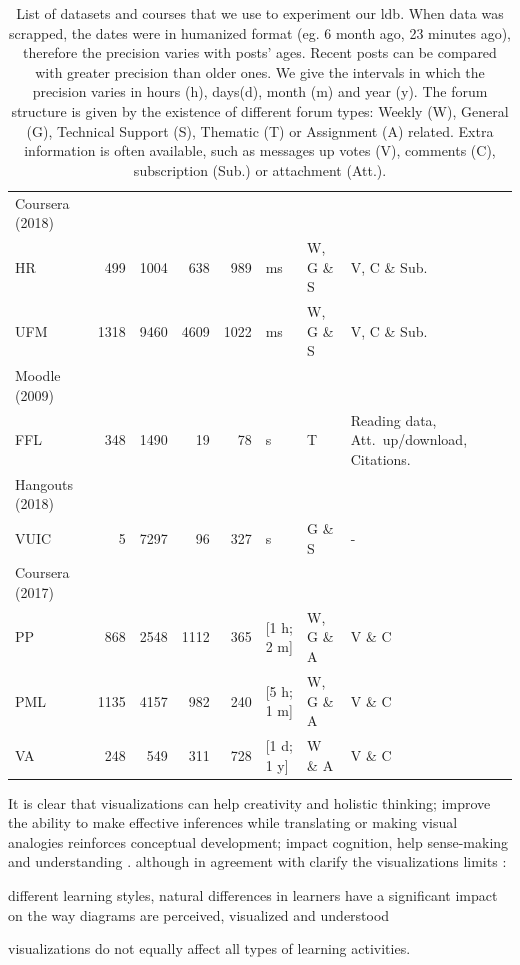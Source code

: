 \documentclass[a4paper,twoside]{article}
\begin{document}
\begin{table}[t]
\begin{tabular}{lllrrllp{}}
    Coursera (2018) &  &  & \multicolumn{1}{l}{} & \multicolumn{1}{l}{} &  &  &  \\ [.2cm]
    HR & \multicolumn{1}{r}{499} & \multicolumn{1}{r}{1004} & 638 & 989 & ms & W, G \& S & V, C \& Sub. \\
    UFM & \multicolumn{1}{r}{1318} & \multicolumn{1}{r}{9460} & 4609 & 1022 & ms & W, G \& S & V, C \& Sub. \\ \hline
    Moodle (2009) &  &  & \multicolumn{1}{l}{} & \multicolumn{1}{l}{} &  &  &  \\ [.2cm]
    FFL & \multicolumn{1}{r}{348} & \multicolumn{1}{r}{1490} & 19 & 78 & s & T & Reading data, Att.~up/download, Citations. \\ \hline
    Hangouts (2018) &  &  & \multicolumn{1}{l}{} & \multicolumn{1}{l}{} &  &  &  \\ [.2cm]
    VUIC & \multicolumn{1}{r}{5} & 7297 & 96 & 327 & s & G \& S & - \\ \hline
    Coursera (2017) &  &  & \multicolumn{1}{l}{} & \multicolumn{1}{l}{} &  &  &  \\ [.2cm]
    PP & \multicolumn{1}{r}{868} & \multicolumn{1}{r}{2548} & 1112 & 365 & [1 h; 2 m] &W, G \& A & V \& C \\
    PML & \multicolumn{1}{r}{1135} & \multicolumn{1}{r}{4157} & 982 & 240 & [5 h; 1 m] & W, G \& A & V \& C \\
    VA & \multicolumn{1}{r}{248} & \multicolumn{1}{r}{549} & 311 & 728 & [1 d; 1 y] & W \& A & V \& C \\
    \bottomrule
  \end{tabular}
  \caption{\label{tab:datasets}List of datasets and courses that we use to experiment our \gls{ldb}.  When data was scrapped, the dates were in humanized format (eg. 6 month ago, 23 minutes ago), therefore the precision varies with posts' ages.  Recent posts can be compared with greater precision than older ones. We give the intervals in which the precision varies in hours (h), days(d), month (m) and year (y).  The forum structure is given by the existence of different forum types: Weekly (W), General (G), Technical Support (S), Thematic (T) or Assignment (A) related.  Extra information is often available, such as messages up votes (V), comments (C), subscription (Sub.) or attachment (Att.). }
\end{table}

It is clear that visualizations can help creativity and holistic thinking; improve the ability to make effective inferences while translating or making visual analogies reinforces conceptual development; impact cognition, help sense-making and understanding \citep{Klerkx2014}.  \cite{Twissell2014} although in agreement with \cite{Klerkx2014} clarify the visualizations limits : 
\begin{inparaenum}
\item different learning styles, natural differences in learners have a significant impact on the way diagrams are perceived, visualized and understood
\item visualizations do not equally affect all types of learning activities.
\end{inparaenum}
\end{document}
